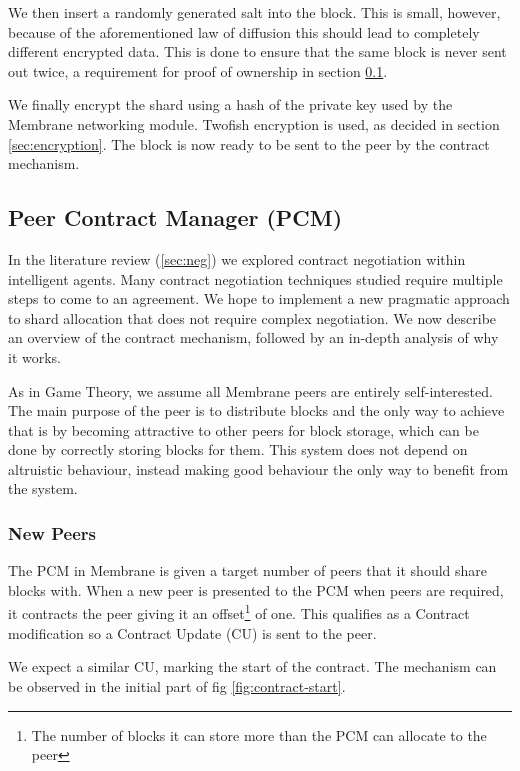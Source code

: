 \documentclass[11pt, a4paper, twocolumn, twoside]{report}
\begin{document}
We then insert a randomly generated salt into the block. This is small, however, because of the aforementioned law of diffusion \citep{shannon1945mathematical} this should lead to completely different encrypted data. This is done to ensure that the same block is never sent out twice, a requirement for proof of ownership in section \ref{sec:contractMech}.

We finally encrypt the shard using a hash of the private key used by the Membrane networking module. Twofish encryption is used, as decided in section \ref{sec:encryption}. The block is now ready to be sent to the peer by the contract mechanism.


\subsection{Peer Contract Manager (PCM)} \label{sec:contractMech}

In the literature review (\ref{sec:neg}) we explored contract negotiation within intelligent agents. Many contract negotiation techniques studied require multiple steps to come to an agreement. We hope to implement a new pragmatic approach to shard allocation that does not require complex negotiation. We now describe an overview of the contract mechanism, followed by an in-depth analysis of why it works.

As in Game Theory, we assume all Membrane peers are entirely self-interested. The main purpose of the peer is to distribute blocks and the only way to achieve that is by becoming attractive to other peers for block storage, which can be done by correctly storing blocks for them. This system does not depend on altruistic behaviour, instead making good behaviour the only way to benefit from the system.

\subsubsection{New Peers}

The PCM in Membrane is given a target number of peers that it should share blocks with. When a new peer is presented to the PCM when peers are required, it contracts the peer giving it an offset\footnote{The number of blocks it can store more than the PCM can allocate to the peer} of one. This qualifies as a Contract modification so a Contract Update (CU) is sent to the peer.

We expect a similar CU, marking the start of the contract. The mechanism can be observed in the initial part of fig \ref{fig:contract-start}.
\end{document}
